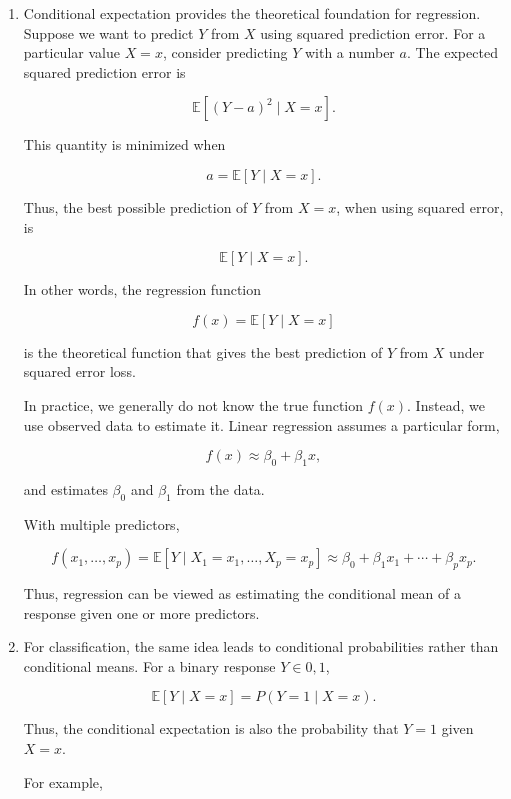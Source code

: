 \documentclass{article}
\begin{document}
\begin{enumerate}
\begin{enumerate}
is the average fuel efficiency for cars with 200 horsepower.

More generally, $\mathbb{E}[Y\mid X]$ is a function of $X$. It gives the expected value of $Y$ for each possible value of $X$ and can therefore be viewed as a prediction of $Y$ based on $X$.

\item Conditional expectation provides the theoretical foundation for regression. Suppose we want to predict $Y$ from $X$ using squared prediction error. For a particular value $X=x$, consider predicting $Y$ with a number $a$. The expected squared prediction error is

$$
\mathbb{E}[(Y-a)^2\mid X=x].
$$

This quantity is minimized when

$$
a=\mathbb{E}[Y\mid X=x].
$$

Thus, the best possible prediction of $Y$ from $X=x$, when using squared error, is

$$
\boxed{\mathbb{E}[Y\mid X=x]}.
$$

In other words, the regression function

$$
f(x)=\mathbb{E}[Y\mid X=x]
$$

is the theoretical function that gives the best prediction of $Y$ from $X$ under squared error loss.

In practice, we generally do not know the true function $f(x)$. Instead, we use observed data to estimate it. Linear regression assumes a particular form,

$$
f(x)\approx \beta_0+\beta_1x,
$$

and estimates $\beta_0$ and $\beta_1$ from the data.

With multiple predictors,

$$
f(x_1,\ldots,x_p)
=\mathbb{E}[Y\mid X_1=x_1,\ldots,X_p=x_p]
\approx
\beta_0+\beta_1x_1+\cdots+\beta_px_p.
$$

Thus, regression can be viewed as estimating the conditional mean of a response given one or more predictors.

\item For classification, the same idea leads to conditional probabilities rather than conditional means. For a binary response $Y\in{0,1}$,

$$
\mathbb{E}[Y\mid X=x]
=
P(Y=1\mid X=x).
$$

Thus, the conditional expectation is also the probability that $Y=1$ given $X=x$.

For example,


\end{enumerate}
\end{enumerate}
\end{document}
